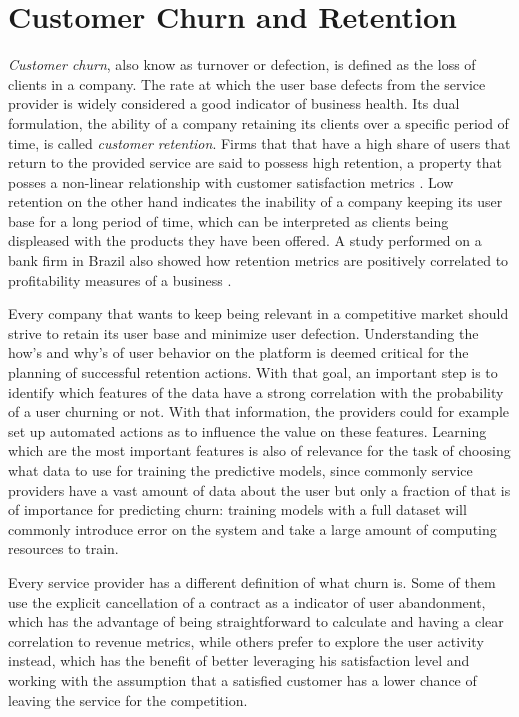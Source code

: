 \documentclass{kththesis}
\begin{document}
\section{Customer Churn and Retention} 

\emph{Customer churn}, also know as turnover or defection, is defined as the loss of clients in a company. The rate at which the user base defects from the service provider is widely considered a good indicator of business health. Its dual formulation, the ability of a company retaining its clients over a specific period of time, is called \emph{customer retention}. Firms that that have a high share of users that return to the provided service are said to possess high retention, a property that posses a non-linear relationship with customer satisfaction  metrics \citep{hennig1997impact}. Low retention on the other hand indicates the inability of a company keeping its user base for a long period of time, which can be interpreted as clients being displeased with the products they have been offered. A study performed on a bank firm in Brazil also showed how retention metrics are positively correlated to profitability measures of a business \citep{morgan2006value}. 
        
Every company that wants to keep being relevant in a competitive market should strive to retain its user base and minimize user defection. Understanding the how's and why's of user behavior on the platform is deemed critical for the planning of successful retention actions. With that goal, an important step is to identify which features of the data have a strong correlation with the probability of a user churning or not. With that information, the providers could for example set up automated actions as to influence the value on these features. Learning which are the most important features is also of relevance for the task of choosing what data to use for training the predictive models, since commonly service providers have a vast amount of data about the user but only a fraction of that is of importance for predicting churn: training models with a full dataset will commonly introduce error on the system and take a large amount of computing resources to train.

Every service provider has a different definition of what churn is. Some of them use the explicit cancellation of a contract as a indicator of user abandonment, which has  the advantage of being straightforward to calculate and having a clear correlation to revenue metrics, while others prefer to explore the user activity instead, which has the benefit of better leveraging his satisfaction level and working with the assumption that a satisfied customer has a lower chance of leaving the service for the competition. 
\end{document}
